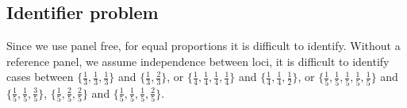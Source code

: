 \documentclass[9pt,lineno]{elife}
\begin{document}


\subsection{Identifier problem}
Since we use panel free, for equal proportions it is difficult to identify.
Without a reference panel, we assume independence between loci, it is difficult to identify cases between $\{\frac{1}{3},\frac{1}{3},\frac{1}{3}\}$ and $\{\frac{1}{3},\frac{2}{3}\}$, or
$\{\frac{1}{4},\frac{1}{4}, \frac{1}{4}, \frac{1}{4}\}$ and $\{\frac{1}{4},\frac{1}{4}, \frac{1}{2}\}$, or $\{\frac{1}{5},\frac{1}{5}, \frac{1}{5}, \frac{1}{5}, \frac{1}{5}\}$ and $\{\frac{1}{5},\frac{1}{5}, \frac{3}{5}\}$, $\{\frac{1}{5},\frac{2}{5}, \frac{2}{5}\}$ and
$\{\frac{1}{5},\frac{1}{5}, \frac{1}{5}, \frac{2}{5}\}$.




\end{document}
